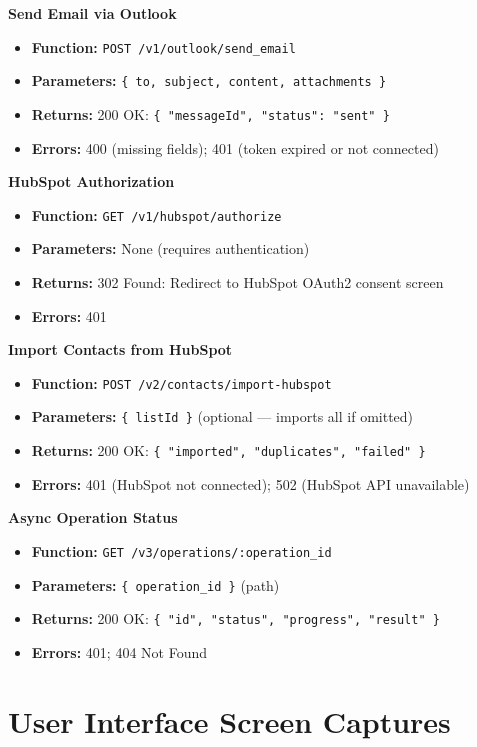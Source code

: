\documentclass[a4paper]{article}
\begin{document}
\textbf{Send Email via Outlook}
\begin{itemize}
  \item \textbf{Function:} \texttt{POST /v1/outlook/send\_email}
  \item \textbf{Parameters:} \texttt{\{ to, subject, content, attachments \}}
  \item \textbf{Returns:} 200 OK: \texttt{\{ "messageId", "status": "sent" \}}
  \item \textbf{Errors:} 400 (missing fields); 401 (token expired or not connected)
\end{itemize}

\textbf{HubSpot Authorization}
\begin{itemize}
  \item \textbf{Function:} \texttt{GET /v1/hubspot/authorize}
  \item \textbf{Parameters:} None (requires authentication)
  \item \textbf{Returns:} 302 Found: Redirect to HubSpot OAuth2 consent screen
  \item \textbf{Errors:} 401
\end{itemize}

\textbf{Import Contacts from HubSpot}
\begin{itemize}
  \item \textbf{Function:} \texttt{POST /v2/contacts/import-hubspot}
  \item \textbf{Parameters:} \texttt{\{ listId \}} (optional --- imports all if omitted)
  \item \textbf{Returns:} 200 OK: \texttt{\{ "imported", "duplicates", "failed" \}}
  \item \textbf{Errors:} 401 (HubSpot not connected); 502 (HubSpot API unavailable)
\end{itemize}

\textbf{Async Operation Status}
\begin{itemize}
  \item \textbf{Function:} \texttt{GET /v3/operations/:operation\_id}
  \item \textbf{Parameters:} \texttt{\{ operation\_id \}} (path)
  \item \textbf{Returns:} 200 OK: \texttt{\{ "id", "status", "progress", "result" \}}
  \item \textbf{Errors:} 401; 404 Not Found
\end{itemize}



\newpage
\section{User Interface Screen Captures}
\label{appendix:ui-screens}
\end{document}
